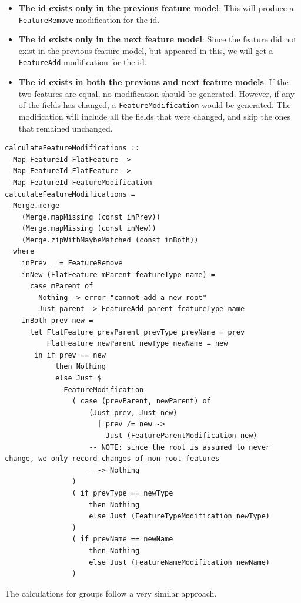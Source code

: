 \documentclass[a4paper,english]{ifimaster}
\begin{document}
\begin{itemize}
  \item \textbf{The id exists only in the previous feature model}: This will produce a \texttt{FeatureRemove} modification for the id.
  \item \textbf{The id exists only in the next feature model}: Since the feature did not exist in the previous feature model, but appeared in this, we will get a \texttt{FeatureAdd} modification for the id.
  \item \textbf{The id exists in both the previous and next feature models}: If the two features are equal, no modification should be generated. However, if any of the fields has changed, a \texttt{FeatureModification} would be generated. The modification will include all the fields that were changed, and skip the ones that remained unchanged.
\end{itemize}

\begin{verbatim}
calculateFeatureModifications ::
  Map FeatureId FlatFeature ->
  Map FeatureId FlatFeature ->
  Map FeatureId FeatureModification
calculateFeatureModifications =
  Merge.merge
    (Merge.mapMissing (const inPrev))
    (Merge.mapMissing (const inNew))
    (Merge.zipWithMaybeMatched (const inBoth))
  where
    inPrev _ = FeatureRemove
    inNew (FlatFeature mParent featureType name) =
      case mParent of
        Nothing -> error "cannot add a new root"
        Just parent -> FeatureAdd parent featureType name
    inBoth prev new =
      let FlatFeature prevParent prevType prevName = prev
          FlatFeature newParent newType newName = new
       in if prev == new
            then Nothing
            else Just $
              FeatureModification
                ( case (prevParent, newParent) of
                    (Just prev, Just new)
                      | prev /= new ->
                        Just (FeatureParentModification new)
                    -- NOTE: since the root is assumed to never change, we only record changes of non-root features
                    _ -> Nothing
                )
                ( if prevType == newType
                    then Nothing
                    else Just (FeatureTypeModification newType)
                )
                ( if prevName == newName
                    then Nothing
                    else Just (FeatureNameModification newName)
                )
\end{verbatim}

The calculations for groups follow a very similar approach.
\end{document}
